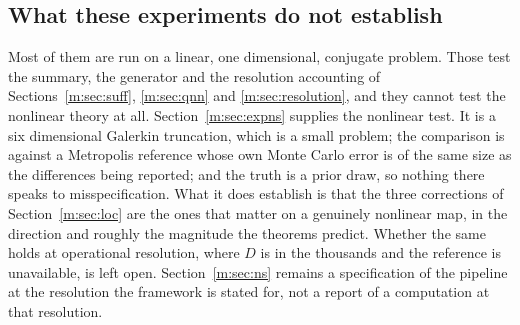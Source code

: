 \subsection{What these experiments do not establish}\label{m:sec:expnot}

Most of them are run on a linear, one dimensional, conjugate problem. Those test the summary, the generator and the resolution accounting of Sections~\ref{m:sec:suff}, \ref{m:sec:qnn} and \ref{m:sec:resolution}, and they cannot test the nonlinear theory at all. Section~\ref{m:sec:expns} supplies the nonlinear test. It is a six dimensional Galerkin truncation, which is a small problem; the comparison is against a Metropolis reference whose own Monte Carlo error is of the same size as the differences being reported; and the truth is a prior draw, so nothing there speaks to misspecification. What it does establish is that the three corrections of Section~\ref{m:sec:loc} are the ones that matter on a genuinely nonlinear map, in the direction and roughly the magnitude the theorems predict. Whether the same holds at operational resolution, where $D$ is in the thousands and the reference is unavailable, is left open. Section~\ref{m:sec:ns} remains a specification of the pipeline at the resolution the framework is stated for, not a report of a computation at that resolution.
